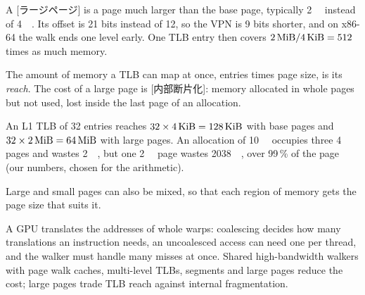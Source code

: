 \documentclass[../main.tex]{subfiles}
\begin{document}
\begin{definition}
  \label{def:l07-large-page}
  A [ラージページ] is a page much larger than the
  base page, typically \SI{2}{\mebi\byte} instead of
  \SI{4}{\kibi\byte}.  Its offset is 21 bits instead of 12, so the VPN
  is 9 bits shorter, and on x86-64 the walk ends one level early.  One
  TLB entry then covers $\SI{2}{\mebi\byte}/\SI{4}{\kibi\byte} = 512$
  times as much memory.
\end{definition}

The amount of memory a TLB can map at once, entries times page size,
is its \emph{reach}.  The cost of a large page is
[内部断片化]: memory allocated in whole
pages but not used, lost inside the last page of an allocation.

\begin{example}
  \label{ex:l07-large-pages}
  An L1 TLB of 32 entries reaches $32 \times \SI{4}{\kibi\byte} =
  \SI{128}{\kibi\byte}$ with base pages and $32 \times
  \SI{2}{\mebi\byte} = \SI{64}{\mebi\byte}$ with large pages.  An
  allocation of \SI{10}{\kibi\byte} occupies three \SI{4}{\kibi\byte}
  pages and wastes \SI{2}{\kibi\byte}, but one \SI{2}{\mebi\byte} page
  wastes \SI{2038}{\kibi\byte}, over 99\,\% of the page (our numbers,
  chosen for the arithmetic).
\end{example}

Large and small pages can also be mixed, so that each region of
memory gets the page size that suits it.

\begin{keypoint}
  A GPU translates the addresses of whole warps: coalescing decides how
  many translations an instruction needs, an uncoalesced access can
  need one per thread, and the walker must handle many misses at once.
  Shared high-bandwidth walkers with page walk caches, multi-level
  TLBs, segments and large pages reduce the cost; large pages trade
  TLB reach against internal fragmentation.
\end{keypoint}
\end{document}
